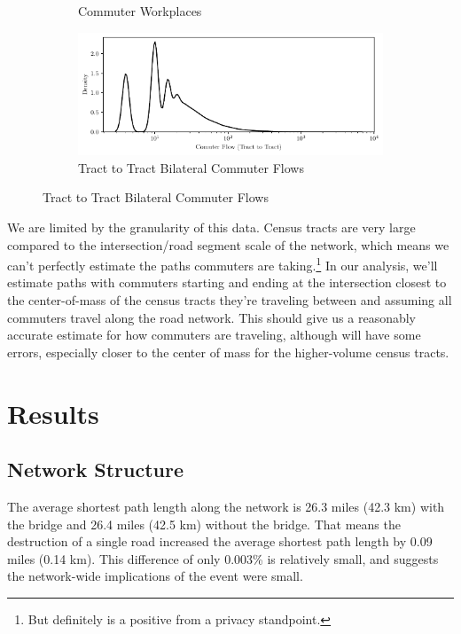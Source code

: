 \documentclass[11pt]{article}
\numberwithin{equation}{section} %
\numberwithin{figure}{section} %
\numberwithin{table}{section} %
\theoremstyle{definition}
\begin{document}
\begin{figure}[t!]
\begin{subfigure}{0.49\textwidth}
    \caption{Commuter Workplaces}
  \end{subfigure}
  \begin{subfigure}{\textwidth}
    \centering
    \includegraphics[width=\textwidth]{graphs/tract_flows.pdf}
    \caption{Tract to Tract Bilateral Commuter Flows}
  \end{subfigure}

  \label{fig:tracts}
\end{figure}

We are limited by the granularity of this data. Census tracts are very large compared to the intersection/road segment scale of the network, which means we can't perfectly estimate the paths commuters are taking.\footnote{But definitely is a positive from a privacy standpoint.} In our analysis, we'll estimate paths with commuters starting and ending at the intersection closest to the center-of-mass of the census tracts they're traveling between and assuming all commuters travel along the road network. This should give us a reasonably accurate estimate for how commuters are traveling, although will have some errors, especially closer to the center of mass for the higher-volume census tracts.


\section{Results} \label{sec:results}

\subsection{Network Structure}

The average shortest path length along the network is 26.3 miles (42.3 km) with the bridge and 26.4 miles (42.5 km) without the bridge. That means the destruction of a single road increased the average shortest path length by 0.09 miles (0.14 km). This difference of only 0.003\% is relatively small, and suggests the network-wide implications of the event were small.
\end{document}
